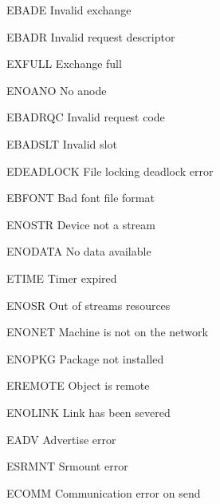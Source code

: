 \begin{datadesc}{EBADE} Invalid exchange \end{datadesc}
\begin{datadesc}{EBADR} Invalid request descriptor \end{datadesc}
\begin{datadesc}{EXFULL} Exchange full \end{datadesc}
\begin{datadesc}{ENOANO} No anode \end{datadesc}
\begin{datadesc}{EBADRQC} Invalid request code \end{datadesc}
\begin{datadesc}{EBADSLT} Invalid slot \end{datadesc}
\begin{datadesc}{EDEADLOCK} File locking deadlock error \end{datadesc}
\begin{datadesc}{EBFONT} Bad font file format \end{datadesc}
\begin{datadesc}{ENOSTR} Device not a stream \end{datadesc}
\begin{datadesc}{ENODATA} No data available \end{datadesc}
\begin{datadesc}{ETIME} Timer expired \end{datadesc}
\begin{datadesc}{ENOSR} Out of streams resources \end{datadesc}
\begin{datadesc}{ENONET} Machine is not on the network \end{datadesc}
\begin{datadesc}{ENOPKG} Package not installed \end{datadesc}
\begin{datadesc}{EREMOTE} Object is remote \end{datadesc}
\begin{datadesc}{ENOLINK} Link has been severed \end{datadesc}
\begin{datadesc}{EADV} Advertise error \end{datadesc}
\begin{datadesc}{ESRMNT} Srmount error \end{datadesc}
\begin{datadesc}{ECOMM} Communication error on send \end{datadesc}
